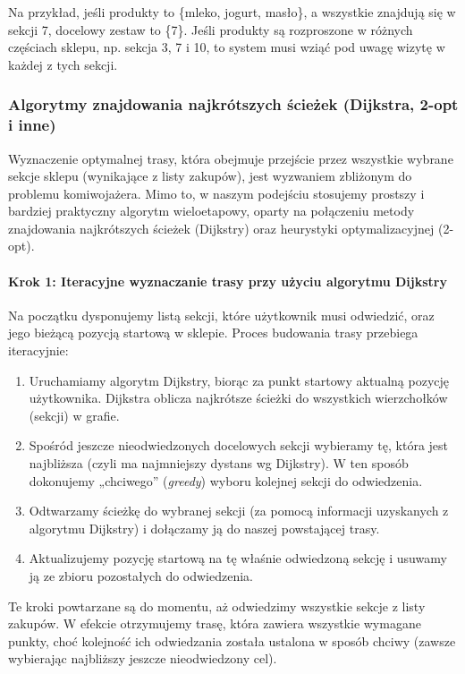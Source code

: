 Na przykład, jeśli produkty to \{mleko, jogurt, masło\}, a wszystkie znajdują się w sekcji 7, docelowy zestaw to \{7\}. Jeśli produkty są rozproszone w różnych częściach sklepu, np. sekcja 3, 7 i 10, to system musi wziąć pod uwagę wizytę w każdej z tych sekcji.

\subsubsection{Algorytmy znajdowania najkrótszych ścieżek (Dijkstra, 2-opt i inne)}
Wyznaczenie optymalnej trasy, która obejmuje przejście przez wszystkie wybrane sekcje sklepu (wynikające z listy zakupów), jest wyzwaniem zbliżonym do problemu komiwojażera. Mimo to, w naszym podejściu stosujemy prostszy i bardziej praktyczny algorytm wieloetapowy, oparty na połączeniu metody znajdowania najkrótszych ścieżek (Dijkstry) oraz heurystyki optymalizacyjnej (2-opt).

\paragraph{Krok 1: Iteracyjne wyznaczanie trasy przy użyciu algorytmu Dijkstry}
Na początku dysponujemy listą sekcji, które użytkownik musi odwiedzić, oraz jego bieżącą pozycją startową w sklepie. Proces budowania trasy przebiega iteracyjnie:
\begin{enumerate}
    \item Uruchamiamy algorytm Dijkstry, biorąc za punkt startowy aktualną pozycję użytkownika. Dijkstra oblicza najkrótsze ścieżki do wszystkich wierzchołków (sekcji) w grafie.
    \item Spośród jeszcze nieodwiedzonych docelowych sekcji wybieramy tę, która jest najbliższa (czyli ma najmniejszy dystans wg Dijkstry). W ten sposób dokonujemy „chciwego” (\emph{greedy}) wyboru kolejnej sekcji do odwiedzenia.
    \item Odtwarzamy ścieżkę do wybranej sekcji (za pomocą informacji uzyskanych z algorytmu Dijkstry) i dołączamy ją do naszej powstającej trasy.
    \item Aktualizujemy pozycję startową na tę właśnie odwiedzoną sekcję i usuwamy ją ze zbioru pozostałych do odwiedzenia.
\end{enumerate}

Te kroki powtarzane są do momentu, aż odwiedzimy wszystkie sekcje z listy zakupów. W efekcie otrzymujemy trasę, która zawiera wszystkie wymagane punkty, choć kolejność ich odwiedzania została ustalona w sposób chciwy (zawsze wybierając najbliższy jeszcze nieodwiedzony cel).

